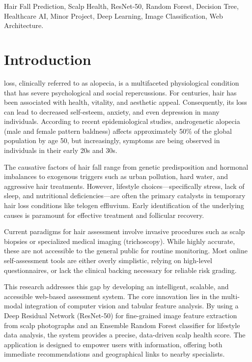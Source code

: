 \documentclass[conference]{IEEEtran}
\begin{document}
\begin{IEEEkeywords}
Hair Fall Prediction, Scalp Health, ResNet-50, Random Forest, Decision Tree, Healthcare AI, Minor Project, Deep Learning, Image Classification, Web Architecture.
\end{IEEEkeywords}

\section{Introduction}
 loss, clinically referred to as alopecia, is a multifaceted physiological condition that has severe psychological and social repercussions. For centuries, hair has been associated with health, vitality, and aesthetic appeal. Consequently, its loss can lead to decreased self-esteem, anxiety, and even depression in many individuals. According to recent epidemiological studies, androgenetic alopecia (male and female pattern baldness) affects approximately 50\% of the global population by age 50, but increasingly, symptoms are being observed in individuals in their early 20s and 30s.

The causative factors of hair fall range from genetic predisposition and hormonal imbalances to exogenous triggers such as urban pollution, hard water, and aggressive hair treatments. However, lifestyle choices—specifically stress, lack of sleep, and nutritional deficiencies—are often the primary catalysts in temporary hair loss conditions like telogen effluvium. Early identification of the underlying causes is paramount for effective treatment and follicular recovery.

Current paradigms for hair assessment involve invasive procedures such as scalp biopsies or specialized medical imaging (trichoscopy). While highly accurate, these are not accessible to the general public for routine monitoring. Most online self-assessment tools are either overly simplistic, relying on high-level questionnaires, or lack the clinical backing necessary for reliable risk grading.

This research addresses this gap by developing an intelligent, scalable, and accessible web-based assessment system. The core innovation lies in the multi-modal integration of computer vision and tabular feature analysis. By using a Deep Residual Network (ResNet-50) for fine-grained image feature extraction from scalp photographs and an Ensemble Random Forest classifier for lifestyle data analysis, the system provides a precise, data-driven scalp health score. The application is designed to empower users with information, offering both immediate recommendations and geographical links to nearby specialists.
\end{document}
